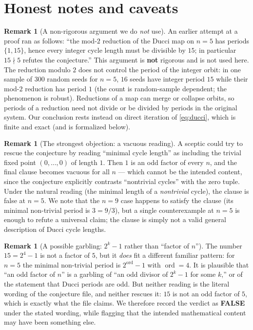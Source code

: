 \documentclass[11pt]{article}
\theoremstyle{definition}
\newtheorem{remark}[theorem]{Remark}
\begin{document}
\section{Honest notes and caveats}

\begin{remark}[A non-rigorous argument we do \emph{not} use]
An earlier attempt at a proof ran as follows: ``the mod-$2$ reduction of the
Ducci map on $n=5$ has periods $\{1,15\}$, hence every integer cycle length must
be divisible by $15$; in particular $15 \nmid 5$ refutes the conjecture.''
This argument is \textbf{not} rigorous and is not used here. The reduction
modulo $2$ does not control the period of the integer orbit: in one sample of
$300$ random seeds for $n=5$, $16$ seeds have integer period $15$ while their
mod-$2$ reduction has period $1$ (the count is random-sample dependent; the
phenomenon is robust). Reductions of a map can merge or collapse orbits, so
periods of a reduction need not divide or be divided by periods in the original
system. Our conclusion rests instead on direct iteration of \eqref{eq:ducci},
which is finite and exact (and is formalized below).
\end{remark}

\begin{remark}[The strongest objection: a vacuous reading]
A sceptic could try to rescue the conjecture by reading ``minimal cycle length''
as including the trivial fixed point $(0,\dots,0)$ of length $1$. Then $1$ is an
odd factor of every $n$, and the final clause becomes vacuous for all $n$ ---
which cannot be the intended content, since the conjecture explicitly contrasts
``nontrivial cycles'' with the zero tuple. Under the natural reading (the
minimal length of a \emph{nontrivial} cycle), the clause is false at $n=5$. We
note that the $n=9$ case happens to satisfy the clause (its minimal non-trivial
period is $3 = 9/3$), but a single counterexample at $n=5$ is enough to refute a
universal claim; the clause is simply not a valid general description of Ducci
cycle lengths.
\end{remark}

\begin{remark}[A possible garbling: $2^k-1$ rather than ``factor of $n$'']
The number $15 = 2^4 - 1$ is not a factor of $5$, but it \emph{does} fit a
different familiar pattern: for $n = 5$ the minimal non-trivial period is
$2^{\operatorname{ord}} - 1$ with $\operatorname{ord} = 4$. It is plausible that
``an odd factor of $n$'' is a garbling of ``an odd divisor of $2^k - 1$ for some
$k$,'' or of the statement that Ducci periods are odd. But neither reading is
the literal wording of the conjecture file, and neither rescues it: $15$ is not
an odd factor of $5$, which is exactly what the file claims. We therefore record
the verdict as \textbf{FALSE} under the stated wording, while flagging that the
intended mathematical content may have been something else.
\end{remark}
\end{document}
